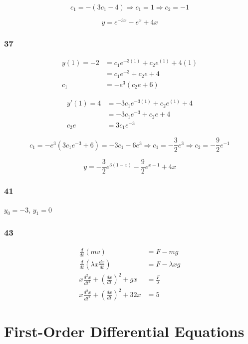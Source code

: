 \documentclass{article}
\begin{document}
\[c_1 = -(3 c_1 - 4) \Rightarrow c_1 = 1 \Rightarrow c_2 = -1\]

\[y = e^{-3 x} - e^x + 4 x\]

\subsubsection{37}

\begin{align*}
  y(1) = -2 & = c_1 e^{-3 (1)} + c_2 e^{(1)} + 4 (1) \\
            & = c_1 e^{-3} + c_2 e + 4               \\
  c_1       & = -e^3 (c_2 e + 6)
\end{align*}

\begin{align*}
  y'(1) = 4 & = -3 c_1 e^{-3 (1)} + c_2 e^{(1)} + 4 \\
            & = -3 c_1 e^{-3} + c_2 e + 4           \\
  c_2 e     & = 3 c_1 e^{-3}
\end{align*}

\[c_1 = -e^3 (3 c_1 e^{-3} + 6) = -3 c_1 - 6 e^3 \Rightarrow c_1 = -\frac{3}{2} e^3 \Rightarrow c_2 = - \frac{9}{2} e^{-1}\]

\[y = -\frac{3}{2} e^{3 (1 - x)} - \frac{9}{2} e^{x - 1} + 4 x\]

\subsubsection{41}

$y_0 = -3$, $y_1 = 0$

\subsubsection{43}

\begin{align*}
  \frac{d}{d t} (m v)                                             & = F - m g           \\
  \frac{d}{d t} (\lambda x \frac{d x}{d t})                       & = F - \lambda x g   \\
  x \frac{d^2 x}{d t^2} + \left( \frac{d x}{d t} \right)^2 + g x  & = \frac{F}{\lambda} \\
  x \frac{d^2 x}{d t^2} + \left( \frac{d x}{d t} \right)^2 + 32 x & = 5
\end{align*}

\section{First-Order Differential Equations}
\end{document}
